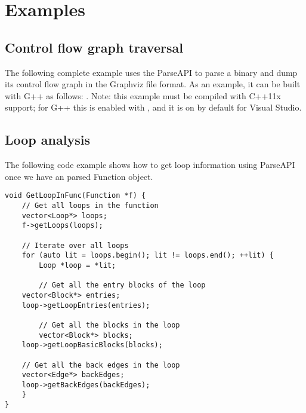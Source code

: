\section{Examples}
\label{sec:example}

\subsection{Control flow graph traversal}

The following complete example uses the ParseAPI to parse a binary and
dump its control flow graph in the Graphviz file format. As an
example, it can be built with G++ as follows: . Note: this example must be compiled with C++11x support;
for G++ this is enabled with , and it is on by
default for Visual Studio.

\lstset{numbers=left, numberstyle=\tiny, stepnumber=5, numbersep=5pt}
\lstset{showstringspaces=false}


\subsection{Loop analysis}

The following code example shows how to get loop information using ParseAPI once we have an parsed Function object.

\lstset{numbers=left, numberstyle=\tiny, stepnumber=5, numbersep=5pt}
\lstset{showstringspaces=false}
\begin{lstlisting}
void GetLoopInFunc(Function *f) {
    // Get all loops in the function
    vector<Loop*> loops;
    f->getLoops(loops);

    // Iterate over all loops
    for (auto lit = loops.begin(); lit != loops.end(); ++lit) {
        Loop *loop = *lit;

        // Get all the entry blocks of the loop
	vector<Block*> entries;
	loop->getLoopEntries(entries);

        // Get all the blocks in the loop
        vector<Block*> blocks;
	loop->getLoopBasicBlocks(blocks);

	// Get all the back edges in the loop
	vector<Edge*> backEdges;
	loop->getBackEdges(backEdges);
    }
}
\end{lstlisting}

